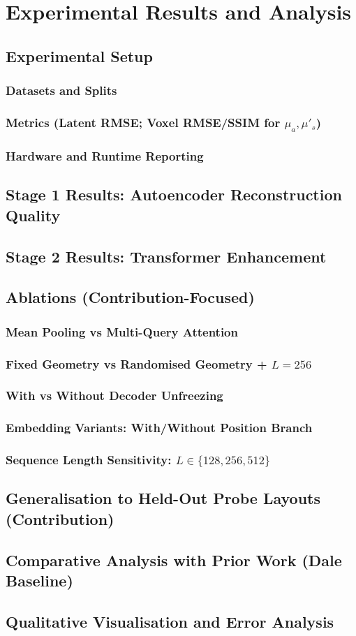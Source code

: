 \chapter{Experimental Results and Analysis}
\section{Experimental Setup}
\subsection{Datasets and Splits}
\subsection{Metrics (Latent RMSE; Voxel RMSE/SSIM for $\mu_a,\mu'_s$)}
\subsection{Hardware and Runtime Reporting}
\section{Stage 1 Results: Autoencoder Reconstruction Quality}
\section{Stage 2 Results: Transformer Enhancement}
\section{Ablations (Contribution-Focused)}
\subsection{Mean Pooling vs Multi-Query Attention}
\subsection{Fixed Geometry vs Randomised Geometry + $L{=}256$}
\subsection{With vs Without Decoder Unfreezing}
\subsection{Embedding Variants: With/Without Position Branch}
\subsection{Sequence Length Sensitivity: $L\in\{128,256,512\}$}
\section{Generalisation to Held-Out Probe Layouts (Contribution)}
\section{Comparative Analysis with Prior Work (Dale Baseline)}
\section{Qualitative Visualisation and Error Analysis}
